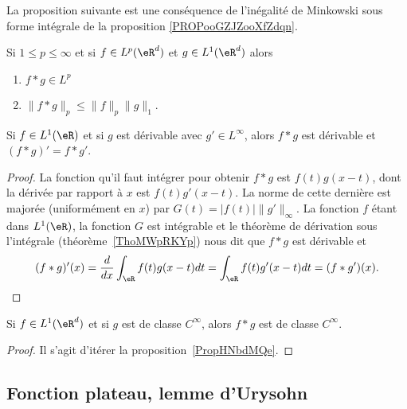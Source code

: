 La proposition suivante est une conséquence de l'inégalité de Minkowski sous forme intégrale de la proposition \ref{PROPooGZJZooXfZdqn}.
\begin{proposition}     \label{PROPooDMMCooPTuQuS}
	Si \( 1\leq p\leq \infty\) et si \( f\in L^p(\eR^d)\) et \( g\in L^1(\eR^d)\) alors
	\begin{enumerate}
		\item
		      \( f*g\in L^p\)
		\item
		      \( \| f*g \|_p\leq \| f \|_p\| g \|_1\).
	\end{enumerate}
\end{proposition}

\begin{proposition} \label{PropHNbdMQe}
	Si \( f\in L^1(\eR)\) et si \( g\) est dérivable avec \( g'\in L^{\infty}\), alors \( f*g\) est dérivable et \( (f*g)'=f*g'\).
\end{proposition}

\begin{proof}
	La fonction qu'il faut intégrer pour obtenir \( f*g\) est \( f(t)g(x-t)\), dont la dérivée par rapport à \( x\) est \( f(t)g'(x-t)\). La norme de cette dernière est majorée (uniformément en \( x\)) par \( G(t)=| f(t) | \| g' \|_{\infty}\). La fonction \( f\) étant dans \( L^1(\eR)\), la fonction \( G\) est intégrable et le théorème de dérivation sous l'intégrale (théorème~\ref{ThoMWpRKYp}) nous dit que \( f*g\) est dérivable et
	\begin{equation}
		(f*g)'(x)=\frac{ d }{ dx }\int_{\eR}f(t)g(x-t)dt=\int_{\eR}f(t)g'(x-t)dt=(f*g')(x).
	\end{equation}
\end{proof}

\begin{corollary}       \label{CORooBSPNooFwYQrc}
	Si \( f\in L^1(\eR^d)\) et si \( g\) est de classe \(  C^{\infty}\), alors \( f*g\) est de classe \(  C^{\infty}\).
\end{corollary}

\begin{proof}
	Il s'agit d'itérer la proposition~\ref{PropHNbdMQe}.
\end{proof}

\subsection{Fonction plateau, lemme d'Urysohn}




